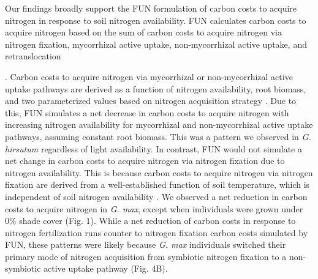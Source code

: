 Our findings broadly support the FUN formulation of carbon costs to acquire nitrogen in response to soil nitrogen availability. FUN calculates carbon costs to acquire nitrogen based on the sum of carbon costs to acquire nitrogen via nitrogen fixation, mycorrhizal active uptake, non-mycorrhizal active uptake, and retranslocation 

. Carbon costs to acquire nitrogen via mycorrhizal or non-mycorrhizal active uptake pathways are derived as a function of nitrogen availability, root biomass, and two parameterized values based on nitrogen acquisition strategy . Due to this, FUN simulates a net decrease in carbon costs to acquire nitrogen with increasing nitrogen availability for mycorrhizal and non-mycorrhizal active uptake pathways, assuming constant root biomass. This was a pattern we observed in \textit{G. hirsutum} regardless of light availability. In contrast, FUN would not simulate a net change in carbon costs to acquire nitrogen via nitrogen fixation due to nitrogen availability. This is because carbon costs to acquire nitrogen via nitrogen fixation are derived from a well-established function of soil temperature, which is independent of soil nitrogen availability . We observed a net reduction in carbon costs to acquire nitrogen in \textit{G. max}, except when individuals were grown under 0\% shade cover (Fig. 1). While a net reduction of carbon costs in response to nitrogen fertilization runs counter to nitrogen fixation carbon costs simulated by FUN, these patterns were likely because \textit{G. max} individuals switched their primary mode of nitrogen acquisition from symbiotic nitrogen fixation to a non-symbiotic active uptake pathway (Fig. 4B).

